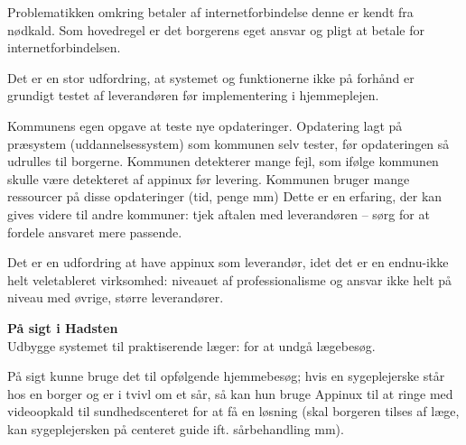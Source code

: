 Problematikken omkring betaler af internetforbindelse  denne er kendt fra nødkald. Som hovedregel er det borgerens eget ansvar og pligt at betale for internetforbindelsen. 

Det er en stor udfordring, at systemet og funktionerne ikke på forhånd er grundigt testet af leverandøren før implementering i hjemmeplejen. 

Kommunens egen opgave at teste nye opdateringer. Opdatering lagt på præsystem (uddannelsessystem) som kommunen selv tester, før opdateringen så udrulles til borgerne. Kommunen detekterer mange fejl, som ifølge kommunen skulle være detekteret af appinux før levering. Kommunen bruger mange ressourcer på disse opdateringer (tid, penge mm) 
Dette er en erfaring, der kan gives videre til andre kommuner: tjek aftalen med leverandøren – sørg for at fordele ansvaret mere passende. 

Det er en udfordring at have appinux som leverandør, idet det er en endnu-ikke helt veletableret virksomhed: niveauet af professionalisme og ansvar ikke helt på niveau med øvrige, større leverandører. 

\textbf{På sigt i Hadsten}
\\
Udbygge systemet til praktiserende læger: for at undgå lægebesøg.

På sigt kunne bruge det til opfølgende hjemmebesøg; hvis en sygeplejerske står hos en borger og er i tvivl om et sår, så kan hun bruge Appinux til at ringe med videoopkald til sundhedscenteret for at få en løsning (skal borgeren tilses af læge, kan sygeplejersken på centeret guide ift. sårbehandling mm).











